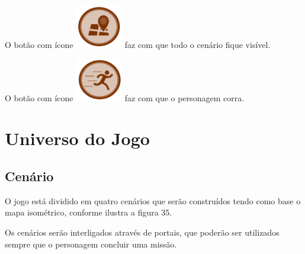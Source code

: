 \begin{alineascomponto}
	\item O botão com ícone \includegraphics[scale=0.5]{figuras/mapa} faz com que todo o cenário fique visível.\\
	
	\item O botão com ícone \includegraphics[scale=0.5]{figuras/homen} faz com que o personagem corra.
	
\end{alineascomponto}

\section {Universo do Jogo}
\label{ap:universo-do-jogo}

\subsection {Cenário}

O jogo está dividido em quatro cenários que serão construídos tendo como base o mapa isométrico, conforme ilustra a figura 35.



\begin{figure}[h!]
		\centering
	\end{figure}

Os cenários serão interligados através de portais, que poderão ser utilizados sempre que o personagem concluir uma missão.


